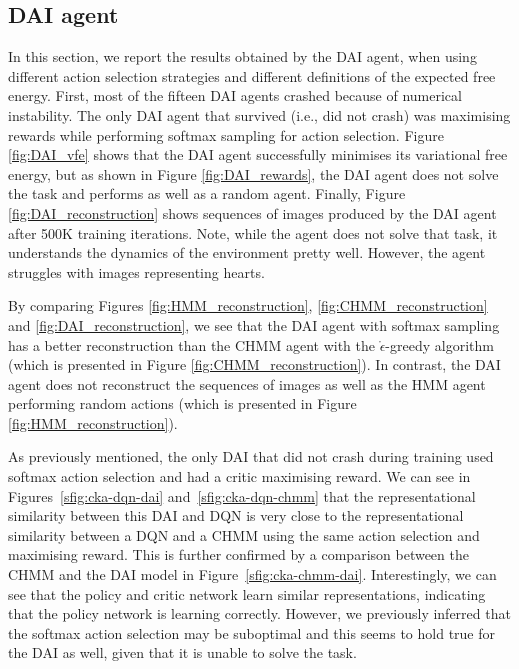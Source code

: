 \documentclass[twoside,11pt]{article}
\providecommand{\DIFadd}[1]{{\protect\color{blue}\uwave{#1}}} %
\providecommand{\DIFaddbegin}{} %
\providecommand{\DIFaddend}{} %
\begin{document}
\DIFaddend \subsection{DAI agent} \label{ssec:dai_results}

In this section, we report the results obtained by the DAI agent, when using different action selection strategies and different definitions of the expected free energy. First, most of the fifteen DAI agents crashed because of numerical instability\DIFaddbegin \DIFadd{, i.e., the VFE suddenly became ``Not a Number"}\DIFaddend . The only DAI agent that survived (i.e., did not crash) was maximising rewards while performing softmax sampling for action selection. Figure \ref{fig:DAI_vfe} shows that the DAI agent successfully minimises its variational free energy, but as shown in Figure \ref{fig:DAI_rewards}, the DAI agent does not solve the task and performs as well as a random agent. Finally, Figure \ref{fig:DAI_reconstruction} shows sequences of images produced by the DAI agent after 500K training iterations. Note, while the agent does not solve that task, it understands the dynamics of the environment pretty well. However, the agent struggles with images representing hearts.

By comparing Figures \ref{fig:HMM_reconstruction}, \ref{fig:CHMM_reconstruction} and \ref{fig:DAI_reconstruction}, we see that the DAI agent with softmax sampling has a better reconstruction than the CHMM agent with the $\mathring{\epsilon}$-greedy algorithm (which is presented in Figure \ref{fig:CHMM_reconstruction}). In contrast, the DAI agent does not reconstruct the sequences of images as well as the HMM agent performing random actions (which is presented in Figure \ref{fig:HMM_reconstruction}).

As previously mentioned, the only DAI that did not crash during training used softmax action selection and had a critic maximising reward. We can see in Figures~\ref{sfig:cka-dqn-dai} and~\ref{sfig:cka-dqn-chmm} that the representational similarity between this DAI and DQN is very close to the representational similarity between a DQN and a CHMM using the same action selection and maximising reward. This is further confirmed by a comparison between the CHMM and the DAI model in Figure~\ref{sfig:cka-chmm-dai}. Interestingly, we can see that the policy and critic network learn similar representations, indicating that the policy network is learning correctly. However, we previously inferred that the softmax action selection may be suboptimal and this seems to hold true for the DAI as well, given that it is unable to solve the task.
\end{document}
